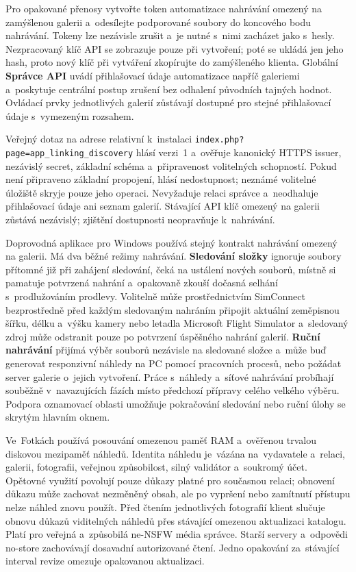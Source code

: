 \documentclass[11pt,a4paper]{article}
\newcommand{\ui}[1]{\textbf{#1}}
\begin{document}
Pro opakované přenosy vytvořte token automatizace nahrávání omezený na
zamýšlenou galerii a~odesílejte podporované soubory do koncového bodu nahrávání.
Tokeny lze nezávisle zrušit a~je nutné s~nimi zacházet jako s~hesly.
Nezpracovaný klíč API se zobrazuje pouze při vytvoření; poté se ukládá jen jeho
hash, proto nový klíč při vytváření zkopírujte do zamýšleného klienta. Globální
\ui{Správce API} uvádí přihlašovací údaje automatizace napříč galeriemi
a~poskytuje centrální postup zrušení bez odhalení původních tajných hodnot.
Ovládací prvky jednotlivých galerií zůstávají dostupné pro stejné přihlašovací
údaje s~vymezeným rozsahem.

Veřejný dotaz na adrese relativní k~instalaci
\texttt{index.php?page=app\_linking\_discovery} hlásí verzi~1 a~ověřuje
kanonický HTTPS issuer, nezávislý secret, základní schéma a~připravenost
volitelných schopností. Pokud není připraveno základní propojení, hlásí
nedostupnost; neznámé volitelné úložiště skryje pouze jeho operaci. Nevyžaduje
relaci správce a~neodhaluje přihlašovací údaje ani seznam galerií. Stávající API
klíč omezený na galerii zůstává nezávislý; zjištění dostupnosti neopravňuje
k~nahrávání.

Doprovodná aplikace pro Windows používá stejný kontrakt nahrávání omezený na
galerii. Má dva běžné režimy nahrávání. \ui{Sledování složky} ignoruje soubory
přítomné již při zahájení sledování, čeká na ustálení nových souborů, místně si
pamatuje potvrzená nahrání a~opakovaně zkouší dočasná selhání s~prodlužováním
prodlevy. Volitelně může prostřednictvím SimConnect bezprostředně před každým
sledovaným nahráním připojit aktuální zeměpisnou šířku, délku a~výšku kamery
nebo letadla Microsoft Flight Simulator a~sledovaný zdroj může odstranit pouze
po potvrzení úspěšného nahrání galerií. \ui{Ruční nahrávání} přijímá výběr
souborů nezávisle na sledované složce a~může buď generovat responzivní náhledy
na PC pomocí pracovních procesů, nebo požádat server galerie o~jejich vytvoření.
Práce s~náhledy a~síťové nahrávání probíhají souběžně v~navazujících fázích
místo předchozí přípravy celého velkého výběru. Podpora oznamovací oblasti
umožňuje pokračování sledování nebo ruční úlohy se skrytým hlavním oknem.

Ve~Fotkách používá posouvání omezenou paměť RAM a~ověřenou trvalou diskovou
mezipaměť náhledů. Identita náhledu je~vázána na~vydavatele a~relaci, galerii,
fotografii, veřejnou způsobilost, silný validátor a~soukromý účet. Opětovné
využití povolují pouze důkazy platné pro současnou relaci; obnovení důkazu může
zachovat nezměněný obsah, ale po vypršení nebo zamítnutí přístupu nelze náhled
znovu použít. Před čtením jednotlivých fotografií klient slučuje obnovu důkazů
viditelných náhledů přes stávající omezenou aktualizaci katalogu. Platí pro
veřejná a~způsobilá ne-NSFW média správce. Starší servery a~odpovědi no-store
zachovávají dosavadní autorizované čtení. Jedno opakování za~stávající interval
revize omezuje opakovanou aktualizaci.
\end{document}
